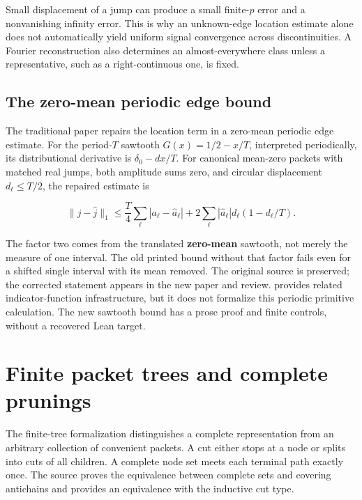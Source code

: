 \documentclass[11pt]{article}
\begin{document}
Small displacement of a jump can produce a small finite-\(p\) error and a nonvanishing infinity error. This is why an unknown-edge location estimate alone does not automatically yield uniform signal convergence across discontinuities. A Fourier reconstruction also determines an almost-everywhere class unless a representative, such as a right-continuous one, is fixed.

\hypertarget{the-zero-mean-periodic-edge-bound}{%
\subsection{The zero-mean periodic edge bound}\label{the-zero-mean-periodic-edge-bound}}

The traditional paper repairs the location term in a zero-mean periodic edge estimate. For the period-\(T\) sawtooth \(G(x)=1/2-x/T\), interpreted periodically, its distributional derivative is \(\delta_0-dx/T\). For canonical mean-zero packets with matched real jumps, both amplitude sums zero, and circular displacement \(d_\ell\le T/2\), the repaired estimate is

\[\|j-\widehat j\|_1\le
\frac{T}{4}\sum_\ell |a_\ell-\widehat a_\ell|
+2\sum_\ell |\widehat a_\ell|d_\ell(1-d_\ell/T).\]

The factor two comes from the translated \textbf{zero-mean} sawtooth, not merely the measure of one interval. The old printed bound without that factor fails even for a shifted single interval with its mean removed. The original source is preserved; the corrected statement appears in the new paper and review. \texttt{} provides related indicator-function infrastructure, but it does not formalize this periodic primitive calculation. The new sawtooth bound has a prose proof and finite controls, without a recovered Lean target.

\hypertarget{finite-packet-trees-and-complete-prunings}{%
\section{Finite packet trees and complete prunings}\label{finite-packet-trees-and-complete-prunings}}

The finite-tree formalization distinguishes a complete representation from an arbitrary collection of convenient packets. A cut either stops at a node or splits into cuts of all children. A complete node set meets each terminal path exactly once. The source proves the equivalence between complete sets and covering antichains and provides an equivalence with the inductive cut type.
\end{document}
